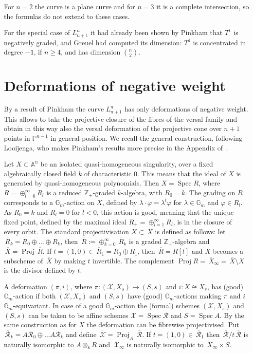 \documentclass[12pt,a4paper]{amsart}  %
\renewcommand{\P}{\mathbb{P}}
\newcommand{\Z}{\mathbb{Z}}
\newcommand{\A}{\mathbb{A}}
\newcommand{\G}{\mathbb{G}}
\newcommand{\vp}{\varphi}
\DeclareMathOperator{\Spec}{Spec}
\DeclareMathOperator{\Proj}{Proj}
\newcommand{\olsi}[1]{\,\overline{\!{#1}}}
\theoremstyle{definition}
\theoremstyle{remark}
\begin{document}
For $n=2$ the curve is a plane curve and for $n=3$ it is a complete intersection,
so the formulas do not extend to these cases.

For the special case of  $L_{n+1}^n$ it had already been shown 
by Pinkham \cite{Pi} that $T^1$ is negatively graded, and Greuel \cite{Gr}
had computed  its dimension:  $T^1$ is concentrated in degree $-1$, if $n\geq 4$,
and has dimension $\binom n2$. 

\section{Deformations of negative weight}
By a result of Pinkham \cite{Pi} the curve  $L_{n+1}^n$ has only deformations of negative weight.  
This allows to  take 
the projective closure of the fibres of the versal family  and obtain  in this way 
also the versal deformation of the projective cone over
$n+1$ points in $\P^{n-1}$ in general position. 
We recall the general construction, following Looijenga, who makes Pinkham's results
\cite{Pi,Pi2}
more precise  in the
Appendix of \cite{Lo}.

Let $X\subset \A^n$ be an isolated  quasi-homogeneous singularity, 
over a fixed algebraically closed field  $k$ of characteristic 0.
This means that the ideal of $X$ is generated by quasi-homogeneous
polynomials. Then 
$X=\Spec R$, where $R=\oplus _{l=0}^\infty R_l$ is a 
reduced $\Z_+$-graded $k$-algebra, with $R_0=k$. The grading on $R$ corresponds
to a $\G_m$-action on $X$, defined by $\lambda \cdot \vp = \lambda^l \vp$ for 
$\lambda \in \G_m$ and $\vp\in R_l$. As $R_0=k$ and $R_l=0$ for $l<0$, this action is good,
meaning that the unique fixed point, defined by the maximal ideal 
$R_+=\oplus _{l=1}^\infty R_l$, is in the closure of every orbit.
The standard projectivisation  $X\subset \olsi X$ is defined as follows:
let $\olsi R_k=R_0\oplus\dots\oplus R_k$, then $\olsi R:= 
\oplus _{k=0}^\infty \olsi R_k$ is a graded $\Z_+$-algebra and 
$\olsi X = \Proj \olsi R$.  If $t=(1,0)\in \olsi R_1=
R_0\oplus R_1$, then $\olsi R = R[t]$  and $X$ becomes a subscheme of $\olsi X$ by
making $t$ invertible. The complement $\Proj R=  \olsi X_\infty=\olsi X \setminus X $ 
is the divisor defined by $t$.


 
A deformation $(\pi,i)$, where  $\pi \colon (\mathcal X,X_s)\to (S,s)$ and $i\colon X\cong X_s$,
has (good) $\G_m$-action if both  $(\mathcal X,X_s)$ and $(S,s)$ have 
(good) $\G_m$-actions making  $\pi$ and $i$  $\G_m$-equivariant. In case of a good 
 $\G_m$-action the (formal) schemes $(\mathcal X,X_s)$ and $(S,s)$ can be taken to be
 affine schemes $\mathcal X = \Spec \mathcal R$ and $S=\Spec A$. 
 By the same construction as for $X$ the deformation can be fibrewise projectivised.
Put $\olsi{\mathcal R}_k= A \mathcal R_0\oplus \dots
 A \mathcal R_k$ and define $\olsi{\mathcal X}=\Proj_A\olsi{\mathcal R}$.
 If $t=(1,0)\in \olsi{\mathcal R}_1$ then $\olsi{\mathcal R}/t\olsi{\mathcal R}$
 is naturally isomorphic to $A\otimes_k R$ and $\olsi{\mathcal X}_\infty$ is
 naturally isomorphic to $\olsi{X}_\infty\times S$. 
 
\end{document}

